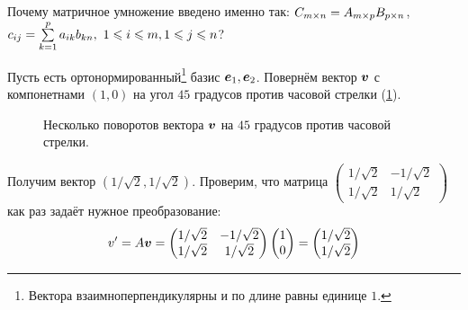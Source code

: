 \documentclass[a4paper,12pt]{article}
\begin{document}
  \begin{remark}
    Почему матричное умножение введено именно так: $C_{m\times n} \hm= A_{m\times p}B_{p\times n}$, $c_{ij} \hm= \sum\limits_{k=1}^p a_{ik} b_{kn},\ 1 \hm\leq i \hm\leq m, 1 \hm\leq j \hm\leq n$?
    
    Пусть есть ортонормированный\footnote{Вектора взаимноперпендикулярны и по длине равны единице $1$.} базис $\boldsymbol e_1, \boldsymbol e_2$.
    Повернём вектор $\boldsymbol v$ с компонетнами $(1, 0)$ на угол $45$ градусов против часовой стрелки (\ref{fig:turning-vector}).
    
    \begin{figure}[h]
      \centering
      
      
      \caption{Несколько поворотов вектора $\boldsymbol v$ на $45$ градусов против часовой стрелки.}
      \label{fig:turning-vector}
    \end{figure}
    
    Получим вектор $\left(1/\sqrt{2}, 1/\sqrt{2}\right)$.
    Проверим, что матрица $\left(\begin{smallmatrix}1/\sqrt{2} & -1/\sqrt{2}\\ 1/\sqrt{2} & 1/\sqrt{2}\end{smallmatrix}\right)$ как раз задаёт нужное преобразование:
    \[
      v'
      = A \boldsymbol v
      = \begin{pmatrix}
          1/\sqrt{2} & -1/\sqrt{2}\\
          1/\sqrt{2} & 1/\sqrt{2}
        \end{pmatrix}
        \begin{pmatrix}
          1 \\ 0
        \end{pmatrix}
      = \begin{pmatrix}
          1/\sqrt{2} \\ 1/\sqrt{2}
        \end{pmatrix}
    \]
    

\end{remark}
\end{document}
